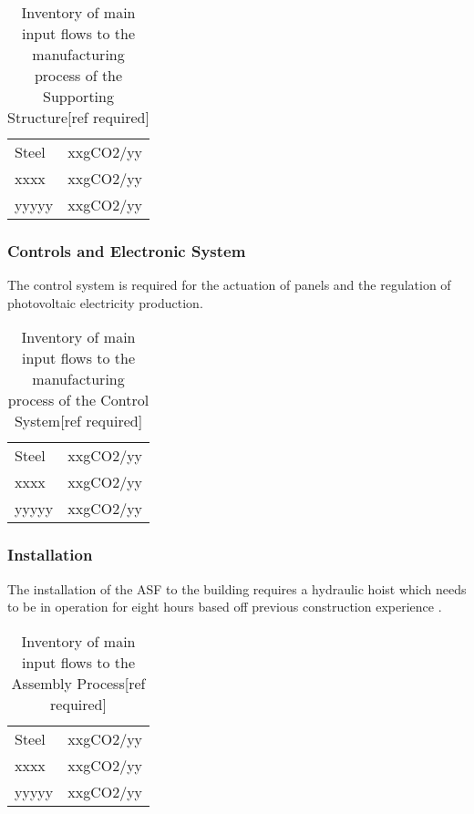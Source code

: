 \begin{table}[H]
\centering
\begin{tabular}{ll}
\hline
Steel & xxgCO2/yy \\
xxxx  & xxgCO2/yy \\
yyyyy & xxgCO2/yy \\
\hline
\end{tabular}
\caption{Inventory of main input flows to the manufacturing process of the Supporting Structure[ref required]}
\label{tab:StructureInv}
\end{table}

\subsubsection*{Controls and Electronic System}
The control system is required for the actuation of panels and the regulation of photovoltaic electricity production.\\

\begin{table}[H]
\centering
\begin{tabular}{ll}
\hline
Steel & xxgCO2/yy \\
xxxx  & xxgCO2/yy \\
yyyyy & xxgCO2/yy \\
\hline
\end{tabular}
\caption{Inventory of main input flows to the manufacturing process of the Control System[ref required]}
\label{tab:ControlInv}
\end{table}

\subsubsection*{Installation}

The installation of the ASF to the building requires a hydraulic hoist which needs to be in operation for eight hours based off previous construction experience \cite{jayathissa2015abs}. \\

\begin{table}[H]
\centering
\begin{tabular}{ll}
\hline
Steel & xxgCO2/yy \\
xxxx  & xxgCO2/yy \\
yyyyy & xxgCO2/yy \\
\hline
\end{tabular}
\caption{Inventory of main input flows to the Assembly Process[ref required]}
\label{tab:AssemblyInv}
\end{table}


